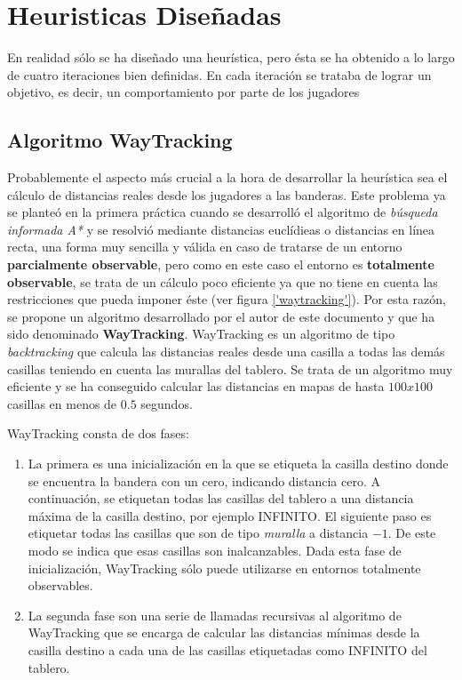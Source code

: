 \section {Heuristicas Diseñadas}
\label{heuristicas}
En realidad sólo se ha diseñado una heurística, pero ésta se ha
obtenido a lo largo de cuatro iteraciones bien definidas. En cada
iteración se trataba de lograr un objetivo, es decir, un
comportamiento por parte de los jugadores

\subsection {Algoritmo WayTracking}
\label{alg:waytracking}
Probablemente el aspecto más crucial a la hora de desarrollar la
heurística sea el cálculo de distancias reales desde los jugadores a
las banderas. Este problema ya se planteó en la primera práctica
cuando se desarrolló el algoritmo de \emph{búsqueda informada A*} y se
resolvió mediante distancias euclídieas o distancias en línea recta,
una forma muy sencilla y válida en caso de tratarse de un entorno
\textbf{parcialmente observable}, pero como en este caso el entorno es
\textbf{totalmente observable}, se trata de un cálculo poco eficiente
ya que no tiene en cuenta las restricciones que pueda imponer éste (ver figura
\ref{'waytracking'}). Por esta razón, se propone un algoritmo
desarrollado por el autor de este documento y que ha sido denominado
\textbf{WayTracking}. WayTracking es un algoritmo de tipo
\emph{backtracking} que calcula las distancias reales desde una
casilla a todas las demás casillas teniendo en cuenta las murallas del
tablero. Se trata de un algoritmo muy eficiente y se ha conseguido
calcular las distancias en mapas de hasta $100x100$ casillas en menos
de $0.5$ segundos.


WayTracking consta de dos fases:
\begin{enumerate}
\item La primera es una inicialización en la que se etiqueta la
  casilla destino donde se encuentra la bandera con un cero, indicando
  distancia cero. A continuación, se etiquetan todas las casillas del
  tablero a una distancia máxima de la casilla destino, por ejemplo
  INFINITO. El siguiente paso es etiquetar todas las casillas que son
  de tipo \emph{muralla} a distancia $-1$. De este modo se indica que
  esas casillas son inalcanzables. Dada esta fase de inicialización,
  WayTracking sólo puede utilizarse en entornos totalmente observables.
\item La segunda fase son una serie de llamadas recursivas al
  algoritmo de WayTracking que se encarga de calcular las distancias
  mínimas desde la casilla destino a cada una de las casillas
  etiquetadas como INFINITO del tablero.
\end{enumerate}


